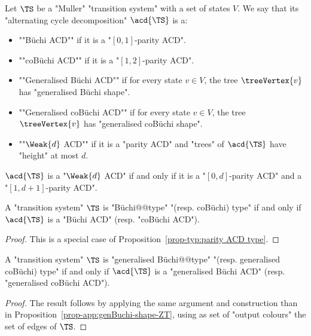 \documentclass[10pt,a4paper]{amsart}
\begin{document}
\begin{definition}
	Let $\TS$ be a "Muller" "transition system" with a set of states $V$. We say that its "alternating cycle decomposition" $\acd{\TS}$ is a:
	\begin{itemize}
		\item \AP ""B\"uchi ACD"" if it is a "$[0,1]$-parity ACD".
		\item \AP ""coB\"uchi ACD"" if it is a "$[1,2]$-parity ACD".
		\item  \AP""Generalised B\"uchi ACD"" if for every state $v\in V$, the tree $\treeVertex{v}$ has "generalised B\"uchi shape".
		\item  \AP""Generalised coB\"uchi ACD"" if for every state $v\in V$, the tree $\treeVertex{v}$ has "generalised coB\"uchi shape".
		\item \AP ""$\Weak{d}$ ACD"" if it is a "parity ACD" and "trees" of $\acd{\TS}$ have "height" at most $d$.
	\end{itemize}
\end{definition}

\begin{remark}\label{rmk-typ:shape-weak-ACD}
	 $\acd{\TS}$ is a "$\Weak{d}$ ACD" if and only if it is a "$[0,d]$-parity ACD" and a "$[1,d+1]$-parity ACD".
\end{remark}

\begin{proposition}
	A "transition system" $\TS$ is "B\"uchi@@type" "(resp. coB\"uchi) type" if and only if $\acd{\TS}$ is a "B\"uchi ACD" (resp. "coB\"uchi ACD").
\end{proposition}
\begin{proof}
	This is a special case of Proposition~\ref{prop-typ:parity ACD type}.
\end{proof}


\begin{proposition}\label{prop-app:genBuchi-ACD type}
	A "transition system" $\TS$ is "generalised B\"uchi@@type" "(resp. generalised coB\"uchi) type" if and only if $\acd{\TS}$ is a "generalised B\"uchi ACD" (resp. "generalised coB\"uchi ACD").
\end{proposition}
\begin{proof}
	The result follows by applying the same argument and construction than in Proposition~\ref{prop-app:genBuchi-shape-ZT}, using as set of "output colours" the set of edges of $\TS$.
\end{proof}
\end{document}

